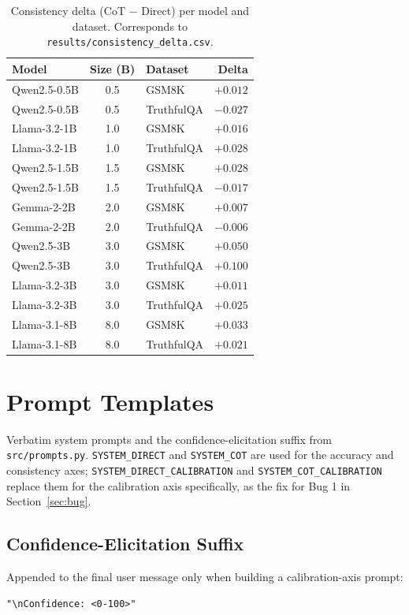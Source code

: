 \documentclass{article}
\begin{document}
\begin{longtable}{lclr}
\caption{Consistency delta (CoT $-$ Direct) per model and dataset. Corresponds to \texttt{results/consistency\_delta.csv}.} \label{tab:full-consistency} \\
\toprule
Model & Size (B) & Dataset & Delta \\
\midrule
\endhead
\bottomrule
\endfoot
Qwen2.5-0.5B & 0.5 & GSM8K & $+0.012$ \\
Qwen2.5-0.5B & 0.5 & TruthfulQA & $-0.027$ \\
Llama-3.2-1B & 1.0 & GSM8K & $+0.016$ \\
Llama-3.2-1B & 1.0 & TruthfulQA & $+0.028$ \\
Qwen2.5-1.5B & 1.5 & GSM8K & $+0.028$ \\
Qwen2.5-1.5B & 1.5 & TruthfulQA & $-0.017$ \\
Gemma-2-2B & 2.0 & GSM8K & $+0.007$ \\
Gemma-2-2B & 2.0 & TruthfulQA & $-0.006$ \\
Qwen2.5-3B & 3.0 & GSM8K & $+0.050$ \\
Qwen2.5-3B & 3.0 & TruthfulQA & $+0.100$ \\
Llama-3.2-3B & 3.0 & GSM8K & $+0.011$ \\
Llama-3.2-3B & 3.0 & TruthfulQA & $+0.025$ \\
Llama-3.1-8B & 8.0 & GSM8K & $+0.033$ \\
Llama-3.1-8B & 8.0 & TruthfulQA & $+0.021$ \\
\end{longtable}

\section{Prompt Templates}
\label{sec:app-prompts}

Verbatim system prompts and the confidence-elicitation suffix from \texttt{src/prompts.py}. \texttt{SYSTEM\_DIRECT} and \texttt{SYSTEM\_COT} are used for the accuracy and consistency axes; \texttt{SYSTEM\_DIRECT\_CALIBRATION} and \texttt{SYSTEM\_COT\_CALIBRATION} replace them for the calibration axis specifically, as the fix for Bug 1 in Section~\ref{sec:bug}.

\subsection{Confidence-Elicitation Suffix}
Appended to the final user message only when building a calibration-axis prompt:
\begin{verbatim}
"\nConfidence: <0-100>"
\end{verbatim}
\end{document}

